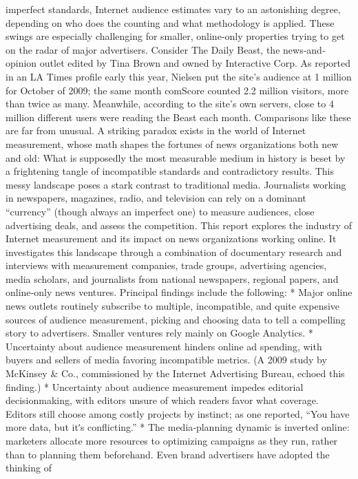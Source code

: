 imperfect standards, Internet audience estimates vary to an astonishing
degree, depending on who does the counting and what methodology is
applied. These swings are especially challenging for smaller, online‐only
properties trying to get on the radar of major advertisers.
Consider The Daily Beast, the news‐and‐opinion outlet edited by Tina
Brown and owned by Interactive Corp. As reported in an LA Times profile
early this year, Nielsen put the site’s audience at 1 million for October of
2009; the same month comScore counted 2.2 million visitors, more than
twice as many. Meanwhile, according to the site’s own servers, close to 4
million different users were reading the Beast each month.
Comparisons like these are far from unusual. A striking paradox exists in
the world of Internet measurement, whose math shapes the fortunes of
news organizations both new and old: What is supposedly the most
measurable medium in history is beset by a frightening tangle of
incompatible standards and contradictory results.
This messy landscape poses a stark contrast to traditional media.
Journalists working in newspapers, magazines, radio, and television can
rely on a dominant ``currency'' (though always an imperfect one) to
measure audiences, close advertising deals, and assess the competition.
This report explores the industry of Internet measurement and its impact
on news organizations working online. It investigates this landscape
through a combination of documentary research and interviews with
measurement companies, trade groups, advertising agencies, media
scholars, and journalists from national newspapers, regional papers, and
online‐only news ventures. Principal findings include the following:
* Major online news outlets routinely subscribe to multiple, incompatible,
and quite expensive sources of audience measurement, picking and
choosing data to tell a compelling story to advertisers. Smaller ventures
rely mainly on Google Analytics.
* Uncertainty about audience measurement hinders online ad spending,
with buyers and sellers of media favoring incompatible metrics. (A 2009
study by McKinsey & Co., commissioned by the Internet Advertising
Bureau, echoed this finding.)
* Uncertainty about audience measurement impedes editorial decisionmaking,
with editors unsure of which readers favor what coverage.
Editors still choose among costly projects by instinct; as one reported,
``You have more data, but itʹs conflicting.''
* The media‐planning dynamic is inverted online: marketers allocate more
resources to optimizing campaigns as they run, rather than to planning
them beforehand. Even brand advertisers have adopted the thinking of
